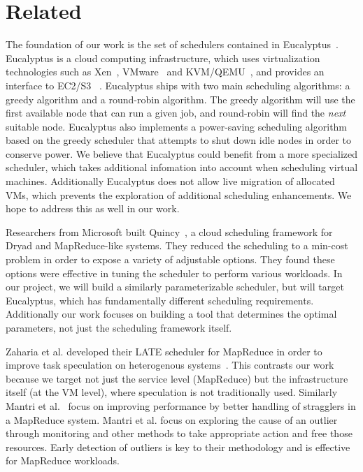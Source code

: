 \section{Related}

The foundation of our work is the set of schedulers contained in
Eucalyptus~\cite{Eucalyptus}.  Eucalyptus is a cloud computing infrastructure,
which uses virtualization technologies such as Xen~\cite{Xen},
VMware~\cite{VMware} and KVM/QEMU~\cite{QEMU}, and provides an interface to
EC2/S3 ~\cite{EC2,S3}.   Eucalyptus ships with two main scheduling algorithms: a
greedy algorithm and a round-robin algorithm.  The greedy algorithm will use the
first available node that can run a given job, and round-robin will find the
\emph{next} suitable node.  Eucalyptus also implements a power-saving scheduling
algorithm based on the greedy scheduler that attempts to shut down idle nodes in
order to conserve power.  We believe that Eucalyptus could benefit from a more
specialized scheduler, which takes additional infomation into account when
scheduling virtual machines.  Additionally Eucalyptus does not allow live
migration of allocated VMs, which prevents the exploration of additional
scheduling enhancements.  We hope to address this as well in our work.

Researchers from Microsoft built Quincy~\cite{Quincy}, a cloud scheduling
framework for Dryad and MapReduce-like systems.  They reduced the scheduling to
a min-cost problem in order to expose a variety of adjustable options.  They
found these options were effective in tuning the scheduler to perform various
workloads.  In our project, we will build a similarly parameterizable scheduler,
but will target Eucalyptus, which has fundamentally different scheduling
requirements.  Additionally our work focuses on building a tool that determines
the optimal parameters, not just the scheduling framework itself.

Zaharia et al. developed their LATE scheduler for MapReduce in order to improve
task speculation on heterogenous systems~\cite{Zaharia}.  This contrasts our
work because we target not just the service level (MapReduce) but the
infrastructure itself (at the VM level), where speculation is not traditionally
used.  Similarly Mantri et al.~\cite{Mantri} focus on improving performance by
better handling of stragglers  in a MapReduce system.  Mantri et al. focus on
exploring the cause of an outlier through monitoring and other methods to take
appropriate action and free those resources.  Early detection of outliers is key
to their methodology and is effective for MapReduce workloads.

